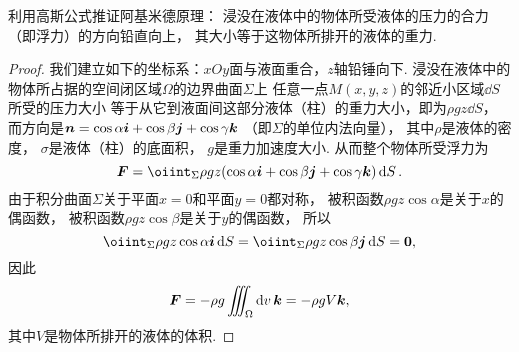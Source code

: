 \begin{example}
利用高斯公式推证阿基米德原理：
浸没在液体中的物体所受液体的压力的合力（即浮力）的方向铅直向上，
其大小等于这物体所排开的液体的重力.
\begin{proof}
我们建立如下的坐标系：\(xOy\)面与液面重合，\(z\)轴铅锤向下.
浸没在液体中的物体所占据的空间闭区域\(\Omega\)的边界曲面\(\Sigma\)上
任意一点\(M(x,y,z)\)的邻近小区域\(\dd{S}\)所受的压力大小
等于从它到液面间这部分液体（柱）的重力大小，即为\(\rho g z \dd{S}\)，
而方向是\(\boldsymbol{n}=\cos\alpha\boldsymbol{i}+\cos\beta\boldsymbol{j}+\cos\gamma\boldsymbol{k}\)
（即\(\Sigma\)的单位内法向量），
其中\(\rho\)是液体的密度，
\(\sigma\)是液体（柱）的底面积，
\(g\)是重力加速度大小.
从而整个物体所受浮力为\begin{equation*}
	\vb{F}
	= \oiint_\Sigma \rho g z
		(\cos\alpha\vb{i}+\cos\beta\vb{j}+\cos\gamma\vb{k}) \dd{S}.
\end{equation*}
由于积分曲面\(\Sigma\)关于平面\(x=0\)和平面\(y=0\)都对称，
被积函数\(\rho g z \cos\alpha\)是关于\(x\)的偶函数，
被积函数\(\rho g z \cos\beta\)是关于\(y\)的偶函数，
所以\begin{equation*}
	\oiint_\Sigma \rho g z \cos\alpha \vb{i} \dd{S}
	= \oiint_\Sigma \rho g z \cos\beta \vb{j} \dd{S}
	= \vb0,
\end{equation*}
因此\begin{equation*}
	\boldsymbol{F}
	= -\rho g \iiint_\Omega \dd{v} \boldsymbol{k}
	= -\rho g V \boldsymbol{k},
\end{equation*}
其中\(V\)是物体所排开的液体的体积.
\end{proof}
\end{example}
